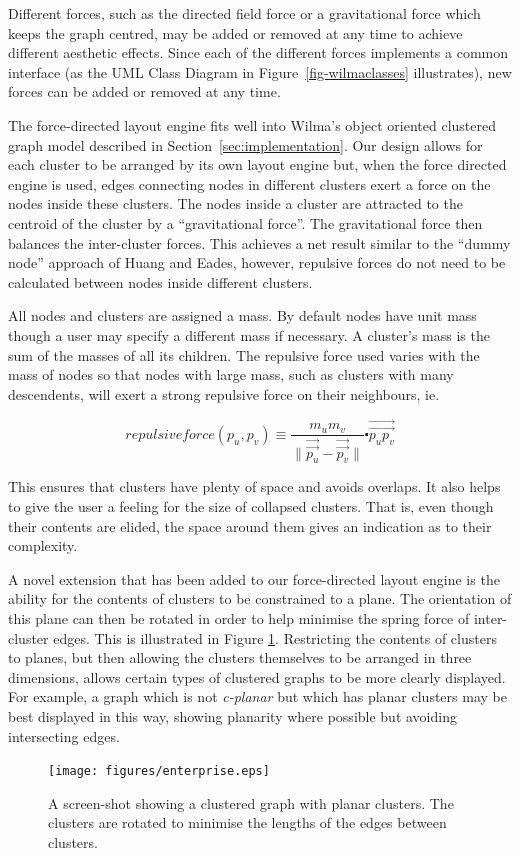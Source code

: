 \documentclass[runningheads]{cl2emult}
\newcommand{\avec}[1]{\vec{\overrightarrow{ #1}}}
\begin{document}
Different forces, such as the directed field force or a gravitational force
which keeps the graph centred, may be added or removed at any time to achieve
different aesthetic effects.  Since each of the different forces implements a
common interface (as the UML Class Diagram in Figure~\ref{fig-wilmaclasses}
illustrates), new forces can be added or removed at any time.

The force-directed layout engine fits well into Wilma's object
oriented clustered graph model described in Section~\ref{sec:implementation}.
Our design allows for each cluster to be arranged by
its own layout engine but, when the force directed engine is used,
edges connecting nodes in different clusters exert a force on
the nodes inside these clusters.  The nodes inside a cluster are
attracted to the centroid of the cluster by a ``gravitational force''.
The gravitational force then balances the inter-cluster forces.  This
achieves a net result similar to the ``dummy node'' approach of Huang
and Eades\cite{Huang:GD98}, however, repulsive forces do not need to be
calculated between nodes inside different clusters.

All nodes and clusters are assigned a mass.  By default nodes have
unit mass though a user may specify a different mass if necessary.
A cluster's mass is the sum of the masses of all its children.
The repulsive force used varies with the mass of nodes so
that nodes with large mass, such as clusters with many descendents,
will exert a strong repulsive force on their neighbours, ie.

\[
\mathit{repulsiveforce}(p_u,p_v) \equiv \frac{m_u m_v}{\|\avec{p_u}-\avec{p_v}\|}
\centerdot \avec{p_u p_v}
\]

This ensures
that clusters have plenty of space and avoids overlaps.  It also helps
to give the user a feeling for the size of collapsed clusters.  That is, even
though their contents are elided, the space around them gives an
indication as to their complexity.

A novel extension that has been added to our force-directed layout
engine is the ability for the contents of clusters to be constrained
to a plane.  The orientation of this plane can then be rotated in
order to help minimise the spring force of inter-cluster edges.  This
is illustrated in Figure \ref{fig-spincluster}.  Restricting the
contents of clusters to planes, but then allowing the clusters
themselves to be arranged in three dimensions, allows certain types of
clustered
graphs to be more clearly displayed.  For example, a graph which is not
{\em c-planar}\cite{Eades:GD96} but which has planar clusters may be best
displayed in this way, showing planarity where possible but avoiding
intersecting edges.
\begin{figure}[h]
  \centering
    \texttt{[image: figures/enterprise.eps]}
  \caption{A screen-shot showing a clustered graph with planar
  clusters.  The clusters are rotated to minimise the lengths of the
  edges between clusters.}
  \label{fig-spincluster}
\end{figure}
\end{document}
